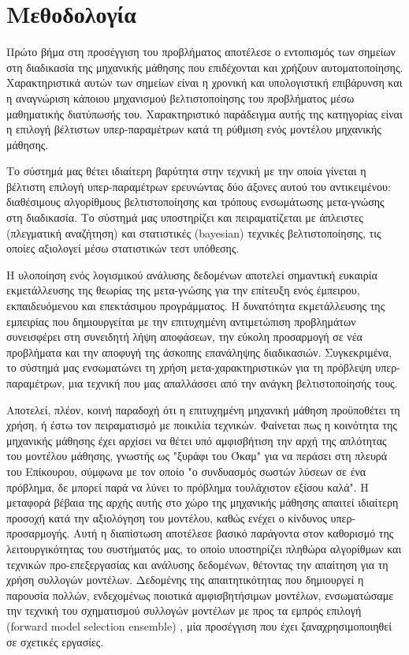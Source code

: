 \section{Μεθοδολογία}
Πρώτο βήμα στη προσέγγιση του προβλήματος αποτέλεσε ο εντοπισμός των σημείων στη διαδικασία της μηχανικής μάθησης που επιδέχονται και χρήζουν αυτοματοποίησης. Χαρακτηριστικά αυτών των σημείων είναι η χρονική και υπολογιστική επιβάρυνση και η αναγνώριση κάποιου μηχανισμού βελτιστοποίησης του προβλήματος μέσω μαθηματικής διατύπωσής του. Χαρακτηριστικό παράδειγμα αυτής της κατηγορίας είναι η επιλογή βέλτιστων υπερ-παραμέτρων κατά τη ρύθμιση ενός μοντέλου μηχανικής μάθησης.

Το σύστημά μας θέτει ιδιαίτερη βαρύτητα στην τεχνική με την οποία γίνεται η βέλτιστη επιλογή υπερ-παραμέτρων ερευνώντας δύο άξονες αυτού του αντικειμένου: διαθέσιμους αλγορίθμους βελτιστοποίησης και τρόπους ενσωμάτωσης μετα-γνώσης στη διαδικασία. Το σύστημά μας υποστηρίζει και πειραματίζεται με άπλειστες (πλεγματική αναζήτηση) και στατιστικές (bayesian) τεχνικές βελτιστοποίησης, τις οποίες αξιολογεί μέσω στατιστικών τεστ υπόθεσης.

Η υλοποίηση ενός λογισμικού ανάλυσης δεδομένων αποτελεί σημαντική ευκαιρία εκμετάλλευσης της θεωρίας της μετα-γνώσης για την επίτευξη ενός έμπειρου, εκπαιδευόμενου και επεκτάσιμου προγράμματος. Η δυνατότητα εκμετάλλευσης της εμπειρίας που δημιουργείται με την επιτυχημένη αντιμετώπιση προβλημάτων συνεισφέρει στη συνειδητή λήψη αποφάσεων, την εύκολη προσαρμογή σε νέα προβλήματα και την αποφυγή της άσκοπης επανάληψης διαδικασιών. Συγκεκριμένα, το σύστημά μας ενσωματώνει τη χρήση μετα-χαρακτηριστικών για τη πρόβλεψη υπερ-παραμέτρων, μια τεχνική που μας απαλλάσσει από την ανάγκη βελτιστοποίησής τους. 

Αποτελεί, πλέον, κοινή παραδοχή ότι η επιτυχημένη μηχανική μάθηση προϋποθέτει τη χρήση, ή έστω τον πειραματισμό με ποικιλία τεχνικών. Φαίνεται πως η κοινότητα της μηχανικής μάθησης έχει αρχίσει να θέτει υπό αμφισβήτιση την αρχή της απλότητας του μοντέλου μάθησης, γνωστής ως "ξυράφι του Όκαμ" για να περάσει στη πλευρά του Επίκουρου, σύμφωνα με τον οποίο "ο συνδυασμός σωστών λύσεων σε ένα πρόβλημα, δε μπορεί παρά να λύνει το πρόβλημα τουλάχιστον εξίσου καλά". Η μεταφορά βέβαια της αρχής αυτής στο χώρο της μηχανικής μάθησης απαιτεί ιδιαίτερη προσοχή κατά την αξιολόγηση του μοντέλου, καθώς ενέχει ο κίνδυνος υπερ-προσαρμογής. Αυτή η διαπίστωση αποτέλεσε βασικό παράγοντα στον καθορισμό της λειτουργικότητας του συστήματός μας, το οποίο υποστηρίζει πληθώρα αλγορίθμων και τεχνικών προ-επεξεργασίας και ανάλυσης δεδομένων, θέτοντας την απαίτηση για τη χρήση συλλογών μοντέλων. Δεδομένης της απαιτητικότητας που δημιουργεί η παρουσία πολλών, ενδεχομένως ποιοτικά αμφισβητήσιμων μοντέλων, ενσωματώσαμε την τεχνική του σχηματισμού συλλογών μοντέλων με προς τα εμπρός επιλογή (forward model selection ensemble) \citep{Caruana:2004:ESL:1015330.1015432}, μία προσέγγιση που έχει ξαναχρησιμοποιηθεί σε σχετικές εργασίες.

